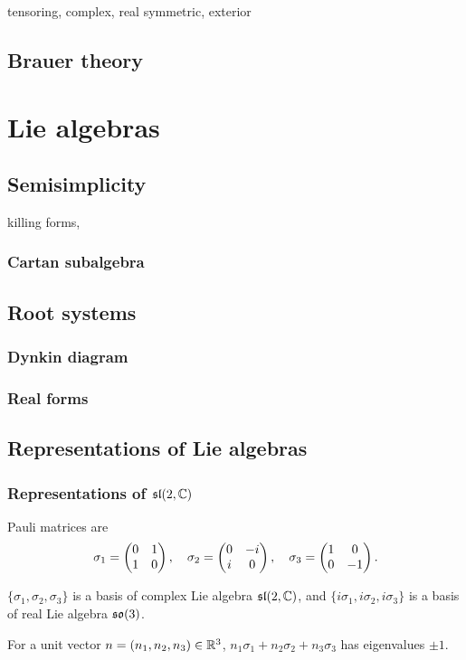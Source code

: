 \documentclass{../note}
\begin{document}
tensoring, complex, real
symmetric, exterior


\chapter{Brauer theory}






\part{Lie algebras}
\chapter{Semisimplicity}
killing forms,
\section{Cartan subalgebra}

\chapter{Root systems}
\section{Dynkin diagram}
\section{Real forms}

\chapter{Representations of Lie algebras}
\section{Representations of $\mathfrak{sl}(2,\mathbb{C})$}
\begin{prb}
Pauli matrices are
\[\sigma_1=\begin{pmatrix}0&1\\1&0\end{pmatrix},\quad\sigma_2=\begin{pmatrix}0&-i\\i&0\end{pmatrix},\quad\sigma_3=\begin{pmatrix}1&0\\0&-1\end{pmatrix}.\]
\begin{parts}
\item $\{\sigma_1,\sigma_2,\sigma_3\}$ is a basis of complex Lie algebra $\mathfrak{sl}(2,\mathbb{C})$, and $\{i\sigma_1,i\sigma_2,i\sigma_3\}$ is a basis of real Lie algebra $\mathfrak{so}(3)$.
\item For a unit vector $n=(n_1,n_2,n_3)\in\mathbb{R}^3$, $n_1\sigma_1+n_2\sigma_2+n_3\sigma_3$ has eigenvalues $\pm1$.
\end{parts}
\end{prb}
\end{document}
